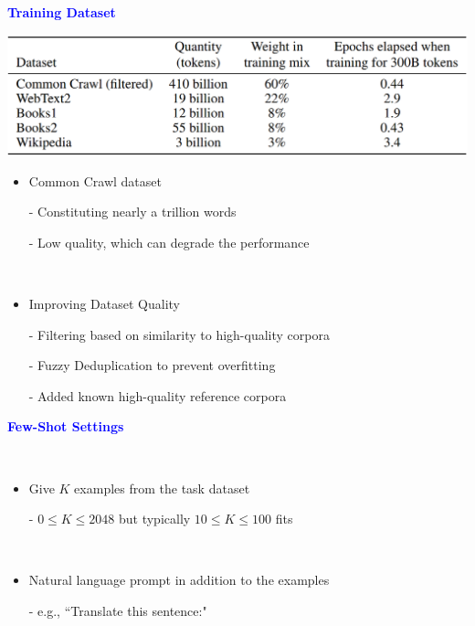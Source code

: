 \documentclass[professionalfont]{beamer}
\begin{document}
\begin{frame}
\begin{center}
    { \textbf{\textcolor{blue}{ {\fontsize{12}{14}\selectfont Training Dataset} }} }
\end{center}

\begin{center}
    \includegraphics[width=1.0\textwidth]{table//2-2.png}
\end{center}

{\fontsize{10}{14}\selectfont 
\begin{itemize}
    \item Common Crawl dataset
    
    - Constituting nearly a trillion words

    - Low quality, which can degrade the performance

    \\[0.2cm]

    \item Improving Dataset Quality

    - Filtering based on similarity to high-quality  corpora

    - Fuzzy Deduplication to prevent overfitting

    - Added known high-quality reference corpora
\end{itemize}
}

\end{frame}

\begin{frame}
\begin{center}
    { \textbf{\textcolor{blue}{ {\fontsize{12}{14}\selectfont Few-Shot Settings} }} }
\end{center}
\\[0.5cm]

{\fontsize{10}{14}\selectfont 
\begin{itemize}
    \item Give \( K \) examples from the task dataset

    - \( 0 \leq K \leq 2048 \) but typically \( 10 \leq K \leq 100 \) fits

    \\[0.2cm]

    \item Natural language prompt in addition to the examples

    - e.g., ``Translate this sentence:"

\end{itemize}
}

\end{frame}
\end{document}
